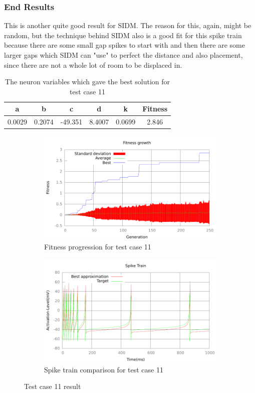 \subsubsection{End Results}\label{sec:test-case-11-results}
This is another quite good result for SIDM. The reason for this, again, might be
random, but the technique behind SIDM also is a good fit for this spike train
because there are some small gap spikes to start with and then there are some
larger gaps which SIDM can "use" to perfect the distance and also placement,
since there are not a whole lot of room to be displaced in.
\begin{table}
	\begin{tabular}{c c c c c c}
		a & b & c & d & k & Fitness\\
		\hline
		0.0029 & 0.2074 & -49.351 & 8.4007 & 0.0699 & 2.846
	\end{tabular}
	\caption{The neuron variables which gave the best solution for test case
	11}
\end{table}
\begin{figure}[h]
	\centering
	\begin{subfigure}[b]{0.5\textwidth}
		\includegraphics[width=\textwidth]{../output/sidm_izzy_4_fitness.pdf}
		\caption{Fitness progression for test case 11}
		\label{fig:fitness-test-case-11}
	\end{subfigure}%
	\begin{subfigure}[b]{0.5\textwidth}
		\includegraphics[width=\textwidth]{../output/sidm_izzy_4_spike.pdf}
		\caption{Spike train comparison for test case 11}
		\label{fig:spike-test-case-11}
	\end{subfigure}
	\caption{Test case 11 result}
\end{figure}

